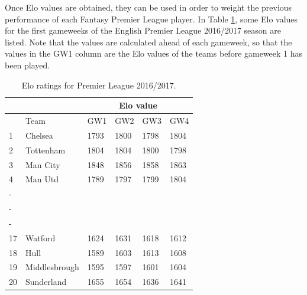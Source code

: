 \newpar


Once Elo values are obtained, they can be used in order to weight the previous performance of each Fantasy Premier League player. In Table \ref{Elo.1617}, some Elo values for the first gameweeks of the English Premier League 2016/2017 season are listed. Note that the values are calculated ahead of each gameweek, so that the values in the GW1 column are the Elo values of the teams before gameweek 1 has been played. 

\begin{table}[H]
\centering
\begin{tabular}{|l|l|l|l|l|l|}
\cline{2-6}
\multicolumn{1}{l|}{} & \multicolumn{1}{l|}{} & \multicolumn{4}{c|}{Elo value}  \\ \cline{2-6} 
\hline
                      & Team                  & GW1    & GW2    & GW3  & GW4    \\
                      \hline
1                     & Chelsea               & 1793   & 1800   & 1798 & 1804   \\
2                     & Tottenham             & 1804   & 1804   & 1800 & 1798   \\
3                     & Man City              & 1848   & 1856   & 1858 & 1863   \\
4                     & Man Utd               & 1789   & 1797   & 1799 & 1804   \\
-                     &                       &        &        &      &        \\
-                     &                       &        &        &      &        \\
-                     &                       &        &        &      &        \\
17                    & Watford               & 1624   & 1631   & 1618 & 1612   \\
18                    & Hull                  & 1589   & 1603   & 1613 & 1608   \\
19                    & Middlesbrough         & 1595   & 1597   & 1601 & 1604   \\
20                    & Sunderland            & 1655   & 1654   & 1636 & 1641   \\
\hline
\end{tabular}
\caption{Elo ratings for Premier League 2016/2017.}
\label{Elo.1617}
\end{table}

